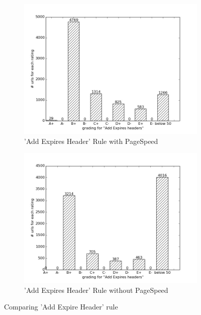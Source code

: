 \documentclass[conference]{IEEEtran}
\begin{document}
\begin{figure}
    \centering
    \begin{subfigure}[b]{\columnwidth}        %
        \centering
	\includegraphics[scale=0.33]{new-img-jpg/container-jpg/Add Expires headers.jpg}
        \caption{'Add Expires Header' Rule with PageSpeed}
        \label{fig:addexpireheader-pagespeed}
    \end{subfigure}
    \hfill
    \begin{subfigure}[b]{\columnwidth}        %
        \centering
  \includegraphics[scale=0.33]{new-img-jpg/deploy-jpg/Add Expires headers.jpg}
        \caption{'Add Expires Header' Rule without PageSpeed}
        \label{fig:addexpireheader-nppagespeed}
    \end{subfigure}
    \caption{Comparing 'Add Expire Header' rule}
    \label{fig:addexpireheader-comparison}
\end{figure}
\end{document}
